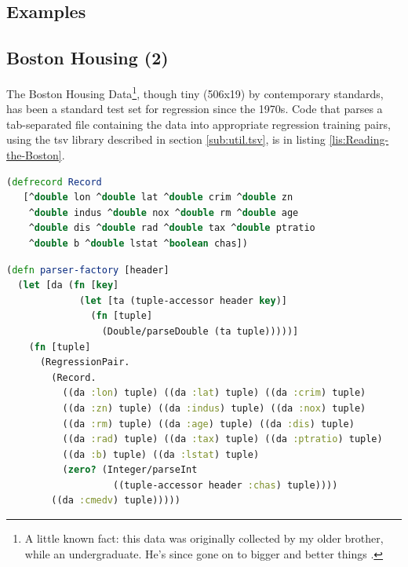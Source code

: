 \documentclass[10pt,openany]{article}
\numberwithin{definition}{section}
\numberwithin{example}{section}
\numberwithin{equation}{section}
\numberwithin{figure}{section}
\begin{document}
\subsection{Examples}

\subsection{Boston Housing (2)}

The Boston Housing Data\footnote{A little known fact: this data was originally collected by my older
brother, while an undergraduate. He's since gone on to bigger and
better things \cite{BostonHousing}.}, though tiny (506x19) by contemporary standards, has been a standard
test set for regression since the 1970s. Code that parses a tab-separated
file containing the data into appropriate regression training pairs,
using the tsv library described in section \ref{sub:util.tsv}, is
in listing \ref{lis:Reading-the-Boston}.

\begin{minipage}[t]{1\columnwidth}%
\begin{lstlisting}[caption={Boston housing record class},label={lis:Reading-the-Boston},language=clojure,tabsize=2]
(defrecord Record
   [^double lon ^double lat ^double crim ^double zn 
    ^double indus ^double nox ^double rm ^double age 
    ^double dis ^double rad ^double tax ^double ptratio
    ^double b ^double lstat ^boolean chas]) 

\end{lstlisting}
%
\end{minipage}

\begin{minipage}[t]{1\columnwidth}%
\begin{lstlisting}[caption={Boston housing parser},label={lis:Reading-the-Boston-2},language=clojure,tabsize=2]
(defn parser-factory [header]
  (let [da (fn [key]
             (let [ta (tuple-accessor header key)] 
               (fn [tuple] 
                 (Double/parseDouble (ta tuple)))))]
    (fn [tuple]
      (RegressionPair.
        (Record.
          ((da :lon) tuple) ((da :lat) tuple) ((da :crim) tuple)
          ((da :zn) tuple) ((da :indus) tuple) ((da :nox) tuple)
          ((da :rm) tuple) ((da :age) tuple) ((da :dis) tuple)
          ((da :rad) tuple) ((da :tax) tuple) ((da :ptratio) tuple)
          ((da :b) tuple) ((da :lstat) tuple) 
          (zero? (Integer/parseInt 
                   ((tuple-accessor header :chas) tuple))))
        ((da :cmedv) tuple)))))
\end{lstlisting}
%
\end{minipage}
\end{document}
